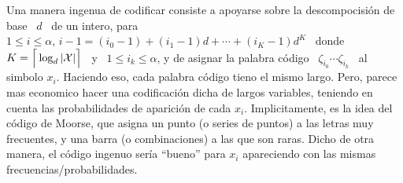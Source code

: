 Una manera ingenua de codificar consiste a apoyarse sobre la descompocisi\'on de
base \  $d$ \ de un  intero, \ie para  $1 \le i \le  \alpha, \, i-1 =  (i_0-1) +
(i_1-1)  d +  \cdots  + (i_K-1)  d^K$  \ donde  \ $K  =  \Big\lceil \log_d  |\mathcal{X}|
\Big\rceil$ \  y \ $1 \le  i_k \le \alpha$, y  de asignar la  palabra c\'odigo \
$\zeta_{i_0} \cdots \zeta_{i_k}$ \ al  simbolo $x_i$. Haciendo eso, cada palabra
c\'odigo  tieno  el   mismo  largo.   Pero,  parece  mas   economico  hacer  una
codificaci\'on dicha de largos  variables, teniendo en cuenta las probabilidades
de aparici\'on de cada $x_i$. Implicitamente, es la idea del c\'odigo de Moorse,
que asigna  un punto (o  series de  puntos) a las  letras muy frecuentes,  y una
barra (o combinaciones) a las que  son raras.  Dicho de otra manera, el c\'odigo
ingenuo   ser\'ia   ``bueno''   para    $x_i$   apareciendo   con   las   mismas
frecuencias/probabilidades.

